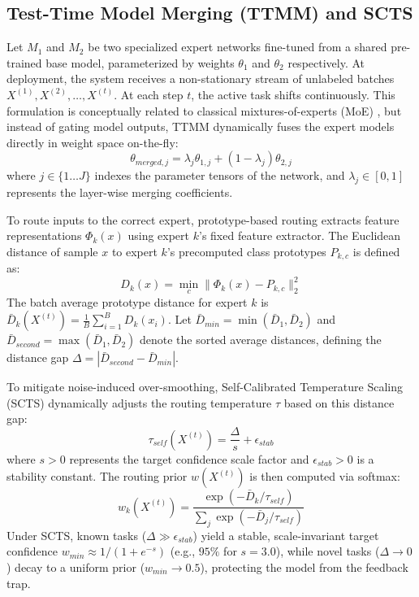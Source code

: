 \documentclass{article}
\theoremstyle{plain}
\theoremstyle{definition}
\theoremstyle{remark}
\begin{document}
\subsection{Test-Time Model Merging (TTMM) and SCTS}
Let $M_1$ and $M_2$ be two specialized expert networks fine-tuned from a shared pre-trained base model, parameterized by weights $\theta_1$ and $\theta_2$ respectively. At deployment, the system receives a non-stationary stream of unlabeled batches $X^{(1)}, X^{(2)}, \dots, X^{(t)}$. At each step $t$, the active task shifts continuously. This formulation is conceptually related to classical mixtures-of-experts (MoE) \cite{schmidt2018deep}, but instead of gating model outputs, TTMM dynamically fuses the expert models directly in weight space on-the-fly:
\begin{equation}
\theta_{merged,j} = \lambda_j \theta_{1,j} + (1 - \lambda_j) \theta_{2,j}
\end{equation}
where $j \in \{1 \dots J\}$ indexes the parameter tensors of the network, and $\lambda_j \in [0, 1]$ represents the layer-wise merging coefficients.

To route inputs to the correct expert, prototype-based routing extracts feature representations $\Phi_k(x)$ using expert $k$'s fixed feature extractor. The Euclidean distance of sample $x$ to expert $k$'s precomputed class prototypes $P_{k,c}$ is defined as:
\begin{equation}
D_k(x) = \min_{c} \|\Phi_k(x) - P_{k,c}\|_2^2
\end{equation}
The batch average prototype distance for expert $k$ is $\bar{D}_k(X^{(t)}) = \frac{1}{B} \sum_{i=1}^B D_k(x_i)$. Let $\bar{D}_{min} = \min(\bar{D}_1, \bar{D}_2)$ and $\bar{D}_{second} = \max(\bar{D}_1, \bar{D}_2)$ denote the sorted average distances, defining the distance gap $\Delta = |\bar{D}_{second} - \bar{D}_{min}|$.

To mitigate noise-induced over-smoothing, Self-Calibrated Temperature Scaling (SCTS) dynamically adjusts the routing temperature $\tau$ based on this distance gap:
\begin{equation}
\tau_{self}(X^{(t)}) = \frac{\Delta}{s} + \epsilon_{stab}
\end{equation}
where $s > 0$ represents the target confidence scale factor and $\epsilon_{stab} > 0$ is a stability constant. The routing prior $w(X^{(t)})$ is then computed via softmax:
\begin{equation}
w_k(X^{(t)}) = \frac{\exp(-\bar{D}_k / \tau_{self})}{\sum_{j} \exp(-\bar{D}_j / \tau_{self})}
\end{equation}
Under SCTS, known tasks ($\Delta \gg \epsilon_{stab}$) yield a stable, scale-invariant target confidence $w_{min} \approx 1/(1+e^{-s})$ (e.g., $95\%$ for $s=3.0$), while novel tasks ($\Delta \to 0$) decay to a uniform prior ($w_{min} \to 0.5$), protecting the model from the feedback trap.
\end{document}
